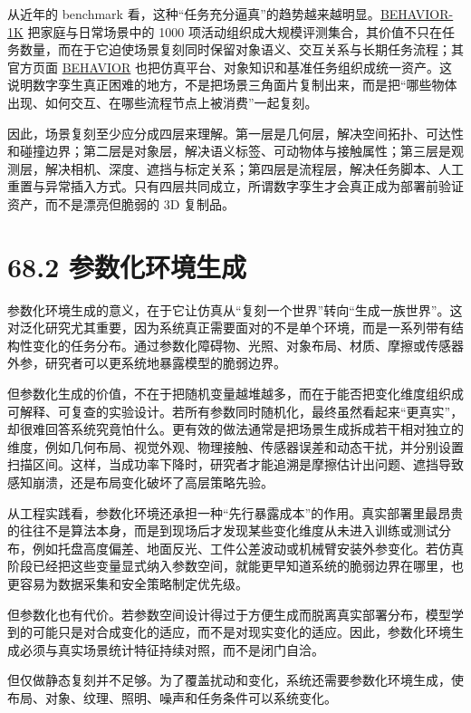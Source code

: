 从近年的 benchmark 看，这种“任务充分逼真”的趋势越来越明显。\href{https://arxiv.org/abs/2403.09227}{BEHAVIOR-1K} 把家庭与日常场景中的 1000 项活动组织成大规模评测集合，其价值不只在任务数量，而在于它迫使场景复刻同时保留对象语义、交互关系与长期任务流程；其官方页面 \href{https://behavior.stanford.edu/}{BEHAVIOR} 也把仿真平台、对象知识和基准任务组织成统一资产。这说明数字孪生真正困难的地方，不是把场景三角面片复制出来，而是把“哪些物体出现、如何交互、在哪些流程节点上被消费”一起复刻。

因此，场景复刻至少应分成四层来理解。第一层是几何层，解决空间拓扑、可达性和碰撞边界；第二层是对象层，解决语义标签、可动物体与接触属性；第三层是观测层，解决相机、深度、遮挡与标定关系；第四层是流程层，解决任务脚本、人工重置与异常插入方式。只有四层共同成立，所谓数字孪生才会真正成为部署前验证资产，而不是漂亮但脆弱的 3D 复制品。

\section*{68.2 参数化环境生成}


参数化环境生成的意义，在于它让仿真从“复刻一个世界”转向“生成一族世界”。这对泛化研究尤其重要，因为系统真正需要面对的不是单个环境，而是一系列带有结构性变化的任务分布。通过参数化障碍物、光照、对象布局、材质、摩擦或传感器外参，研究者可以更系统地暴露模型的脆弱边界。

但参数化生成的价值，不在于把随机变量越堆越多，而在于能否把变化维度组织成可解释、可复查的实验设计。若所有参数同时随机化，最终虽然看起来“更真实”，却很难回答系统究竟怕什么。更有效的做法通常是把场景生成拆成若干相对独立的维度，例如几何布局、视觉外观、物理接触、传感器误差和动态干扰，并分别设置扫描区间。这样，当成功率下降时，研究者才能追溯是摩擦估计出问题、遮挡导致感知崩溃，还是布局变化破坏了高层策略先验。

从工程实践看，参数化环境还承担一种“先行暴露成本”的作用。真实部署里最昂贵的往往不是算法本身，而是到现场后才发现某些变化维度从未进入训练或测试分布，例如托盘高度偏差、地面反光、工件公差波动或机械臂安装外参变化。若仿真阶段已经把这些变量显式纳入参数空间，就能更早知道系统的脆弱边界在哪里，也更容易为数据采集和安全策略制定优先级。

但参数化也有代价。若参数空间设计得过于方便生成而脱离真实部署分布，模型学到的可能只是对合成变化的适应，而不是对现实变化的适应。因此，参数化环境生成必须与真实场景统计特征持续对照，而不是闭门自洽。

但仅做静态复刻并不足够。为了覆盖扰动和变化，系统还需要参数化环境生成，使布局、对象、纹理、照明、噪声和任务条件可以系统变化。

